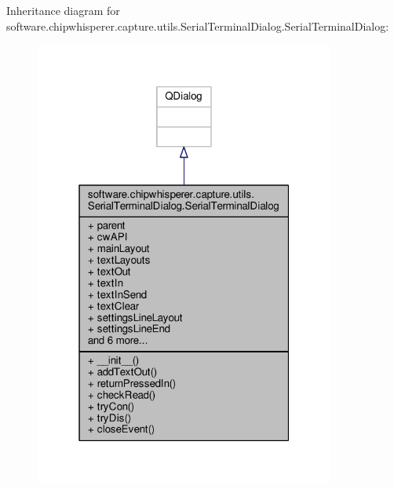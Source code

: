 Inheritance diagram for software.\+chipwhisperer.\+capture.\+utils.\+Serial\+Terminal\+Dialog.\+Serial\+Terminal\+Dialog\+:\nopagebreak
\begin{figure}[H]
\begin{center}
\leavevmode
\includegraphics[width=280pt]{dc/df1/classsoftware_1_1chipwhisperer_1_1capture_1_1utils_1_1SerialTerminalDialog_1_1SerialTerminalDialog__inherit__graph}
\end{center}
\end{figure}


